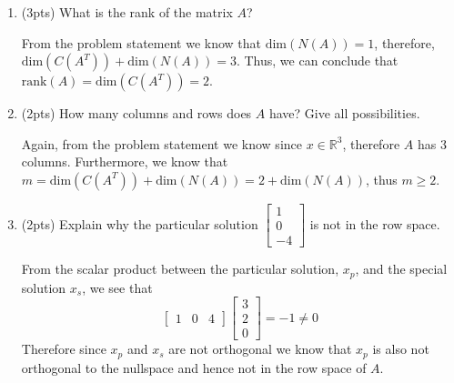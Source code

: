 \begin{enumerate}[label=(\alph*)]
    \item (3pts) What is the rank of the matrix $A$?
        \begin{mdframed}[style=MyFrame]
            From the problem statement we know that $\text{dim}(N(A))=1$,
            therefore, $\text{dim}(C(A^{T})) +
            \text{dim}(N(A)) = 3$.  Thus, we can conclude that 
            $\text{rank}(A) = \text{dim}(C(A^{T})) = 2$.
        \end{mdframed}
    \item (2pts) How many columns and rows does $A$ have? Give all
        possibilities.
        \begin{mdframed}[style=MyFrame]
            Again, from the problem statement we know since $x \in
            \mathbb{R}^{3}$, therefore $A$ has 3 columns.  Furthermore, we know
            that $m = \text{dim}(C(A^{T})) + \text{dim}(N(A)) = 2 +
            \text{dim}(N(A))$, thus $ m \geq 2 $.
        \end{mdframed}
    \item (2pts) Explain why the particular solution
        $\begin{bmatrix} 1  \\  0   \\  -4 \end{bmatrix}$ is not in the row
            space.
            \begin{mdframed}[style=MyFrame]
                From the scalar product between the particular solution,
                $x_{p}$, and the special solution $x_{s}$, we see that 
                \begin{equation}
                    \begin{bmatrix}
                        1   &   0   &   4
                    \end{bmatrix}
                    \begin{bmatrix}
                        3   \\
                        2   \\
                        0
                    \end{bmatrix}
                    = 
                    -1
                    \neq 0
                \end{equation}
                Therefore since $x_{p}$ and $x_{s}$ are not orthogonal we
                know that $x_{p}$ is also not orthogonal to the nullspace
                and hence not in the row space of $A$.
            \end{mdframed}

\end{enumerate}

